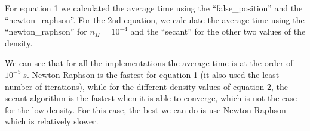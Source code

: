 \documentclass[a4paper,10pt]{article}
\begin{document}
For equation 1 we calculated the average time using the ``false\_position'' and the ``newton\_raphson''. For the 2nd equation, we calculate the average time using the ``newton\_raphson'' for $n_H=10^{-4}$ and the ``secant'' for the other two values of the density. 



We can see that for all the implementations the average time is at the order of $10^{-5}\: s$. Newton-Raphson is the fastest for equation 1 (it also used the least number of iterations), while for the different density values of equation 2, the secant algorithm is the fastest when it is able to converge, which is not the case for the low density. For this case, the best we can do is use Newton-Raphson which is relatively slower. 


\end{document}
